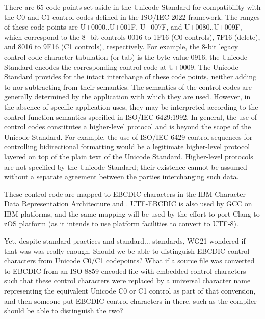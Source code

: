 \documentclass{wg21}
\begin{document}
\begin{quoteblock}
    There are 65 code points set aside in the Unicode Standard for compatibility with the C0
    and C1 control codes defined in the ISO/IEC 2022 framework. The ranges of these code points are U+0000..U+001F, U+007F, and U+0080..U+009F, which correspond to the 8-
    bit controls 0016 to 1F16 (C0 controls), 7F16 (delete), and 8016 to 9F16 (C1 controls),
    respectively. For example, the 8-bit legacy control code character tabulation (or tab) is the
    byte value 0916; the Unicode Standard encodes the corresponding control code at U+0009.
    The Unicode Standard provides for the intact interchange of these code points, neither
    adding to nor subtracting from their semantics. The semantics of the control codes are
    generally determined by the application with which they are used. However, in the absence
    of specific application uses, they may be interpreted according to the control function
    semantics specified in ISO/IEC 6429:1992.
    In general, the use of control codes constitutes a higher-level protocol and is beyond the
    scope of the Unicode Standard. For example, the use of ISO/IEC 6429 control sequences
    for controlling bidirectional formatting would be a legitimate higher-level protocol layered
    on top of the plain text of the Unicode Standard. Higher-level protocols are not specified
    by the Unicode Standard; their existence cannot be assumed without a separate agreement
    between the parties interchanging such data.
\end{quoteblock}

These control code are mapped to EBCDIC characters in the IBM Character Data Representation Architecture \cite{CDRA} and \cite{UTF-EBCDIC}.
UTF-EBCDIC is also used by GCC on IBM platforms, and the same mapping will be used by the effort to port Clang to zOS platform
(as it intends to use platform facilities to convert to UTF-8).

Yet, despite standard practices and standard... standards, WG21 wondered if that was was really enough.
Should we be able to distinguish EBCDIC control characters from Unicode C0/C1 codepoints?
What if a source file was converted to EBCDIC from an ISO 8859 encoded file with embedded control characters such that these control characters were replaced
by a universal character name representing the equivalent Unicode C0 or C1 control as part of that conversion, and then someone put EBCDIC control characters in there, such as the compiler should be able to distinguish the two?
\end{document}
